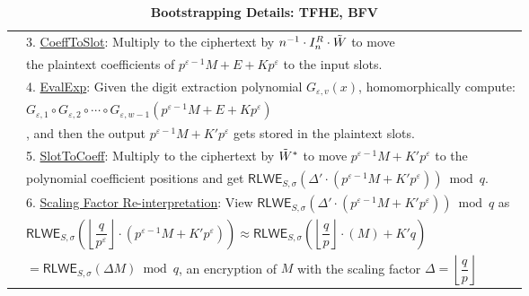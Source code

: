 \begin{table}[h]
\begin{tabular}{|c||l|}
&3. \underline{\textsf{CoeffToSlot}}: Multiply to the ciphertext by $n^{-1}\cdot I_n^R \cdot \tilde W$ to move\\
& \text{ } \text{ } the plaintext coefficients of $p^{\varepsilon-1} M + E + Kp^\varepsilon$ to the input slots.\\
&4. \underline{\textsf{EvalExp}}: Given the digit extraction polynomial $G_{\varepsilon, v}(x)$, homomorphically compute:\\
&\text{ } \text{ } $G_{\varepsilon, 1} \circ G_{\varepsilon, 2}\circ \cdots \circ G_{\varepsilon, w-1} (p^{\varepsilon-1} M + E + Kp^\varepsilon)$\\
&\text{ } \text{ }, and then the output $p^{\varepsilon-1}M + K'p^\varepsilon$ gets stored in the plaintext slots.\\
&5. \underline{\textsf{SlotToCoeff}}: Multiply to the ciphertext by $\tilde W^*$ to move $p^{\varepsilon-1}M + K'p^\varepsilon$ to the \\
&\text{ } \text{ } polynomial coefficient positions and get $\textsf{RLWE}_{S, \sigma}(\Delta'\cdot(p^{\varepsilon-1}M + K'p^\varepsilon)) \bmod q$.\\
&6. \underline{Scaling Factor Re-interpretation}: View $\textsf{RLWE}_{S, \sigma}(\Delta'\cdot(p^{\varepsilon-1}M + K'p^\varepsilon)) \bmod q$ as\\
&\text{ } \text{ } $\textsf{RLWE}_{S, \sigma}\left(\left\lfloor\dfrac{q}{p^\varepsilon}\right\rfloor\cdot(p^{\varepsilon-1}M + K'p^\varepsilon)\right) \approx \textsf{RLWE}_{S, \sigma}\left(\left\lfloor\dfrac{q}{p}\right\rfloor\cdot(M) + K'q\right)$\\
&\text{ } \text{ }$ = \textsf{RLWE}_{S, \sigma}(\Delta M) \bmod q$, an encryption of $M$ with the scaling factor $\Delta = \left\lfloor\dfrac{q}{p}\right\rfloor$\\
\hline
\end{tabular}
\caption{\textbf{Bootstrapping Details: TFHE, BFV}}
\end{table}

